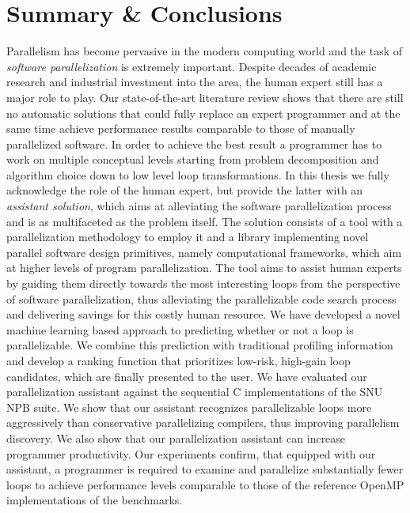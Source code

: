\chapter{Summary \& Conclusions}
\label{conclusion}
\quad Parallelism has become pervasive in the modern computing world and the task of \textit{software parallelization} is extremely important. Despite decades of academic research and industrial investment into the area, the human expert still has a major role to play. Our state-of-the-art literature review shows that there are still no automatic solutions that could fully replace an expert programmer and at the same time achieve performance results comparable to those of manually parallelized software.\newline\null
\quad In order to achieve the best result a programmer has to work on multiple conceptual levels starting from problem decomposition and algorithm choice down to low level loop transformations. In this thesis we fully acknowledge the role of the human expert, but provide the latter with an \textit{assistant solution}, which aims at alleviating the software parallelization process and is as multifaceted as the problem itself. The solution consists of a tool with a parallelization methodology to employ it and a library implementing novel parallel software design primitives, namely computational frameworks, which aim at higher levels of program parallelization.\newline\null
\quad The tool aims to assist human experts by guiding them directly towards the most interesting loops from the perspective of software parallelization, thus alleviating the parallelizable code search process and delivering savings for this costly human resource. We have developed a novel machine learning based approach to predicting whether or not a loop is parallelizable. We combine this prediction with traditional profiling information and develop a ranking function that prioritizes low-risk, high-gain loop candidates, which are finally presented to the user.\newline\null
\quad We have evaluated our parallelization assistant against the sequential C implementations of the SNU NPB suite. We show that our assistant recognizes parallelizable loops more aggressively than conservative parallelizing compilers, thus improving parallelism discovery. We also show that our parallelization assistant can increase programmer productivity. Our experiments confirm, that equipped with our assistant, a programmer is required to examine and parallelize substantially fewer loops to achieve performance levels comparable to those of the reference OpenMP implementations of the benchmarks.\newline\null
